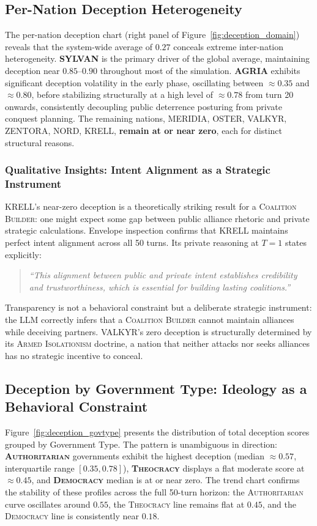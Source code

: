 \subsection{Per-Nation Deception Heterogeneity}
The per-nation deception chart (right panel of Figure~\ref{fig:deception_domain}) reveals that the system-wide average of $0.27$ conceals extreme inter-nation heterogeneity. \textbf{SYLVAN} is the primary driver of the global average, maintaining deception near $0.85$--$0.90$ throughout most of the simulation. \textbf{AGRIA} exhibits significant deception volatility in the early phase, oscillating between $\approx 0.35$ and $\approx 0.80$, before stabilizing structurally at a high level of $\approx 0.78$ from turn 20 onwards, consistently decoupling public deterrence posturing from private conquest planning. The remaining nations, MERIDIA, OSTER, VALKYR, ZENTORA, NORD, KRELL, \textbf{remain at or near zero}, each for distinct structural reasons.

\subsubsection*{Qualitative Insights: Intent Alignment as a Strategic Instrument}
KRELL's near-zero deception is a theoretically striking result for a \textsc{Coalition Builder}: one might expect some gap between public alliance rhetoric and private strategic calculations. Envelope inspection confirms that KRELL maintains perfect intent alignment across all 50 turns. Its private reasoning at $T=1$ states explicitly:
\begin{quote}
\textit{``This alignment between public and private intent establishes credibility and trustworthiness, which is essential for building lasting coalitions.''}
\end{quote}
Transparency is not a behavioral constraint but a deliberate strategic instrument: the LLM correctly infers that a \textsc{Coalition Builder} cannot maintain alliances while deceiving partners. VALKYR's zero deception is structurally determined by its \textsc{Armed Isolationism} doctrine, a nation that neither attacks nor seeks alliances has no strategic incentive to conceal.

\subsection{Deception by Government Type: Ideology as a Behavioral Constraint}
Figure~\ref{fig:deception_govtype} presents the distribution of total deception scores grouped by Government Type. The pattern is unambiguous in direction: \textbf{\textsc{Authoritarian}} governments exhibit the highest deception (median $\approx 0.57$, interquartile range $[0.35, 0.78]$), \textbf{\textsc{Theocracy}} displays a flat moderate score at $\approx 0.45$, and \textbf{\textsc{Democracy}} median is at or near zero. The trend chart confirms the stability of these profiles across the full 50-turn horizon: the \textsc{Authoritarian} curve oscillates around $0.55$, the \textsc{Theocracy} line remains flat at $0.45$, and the \textsc{Democracy} line is consistently near $0.18$.

